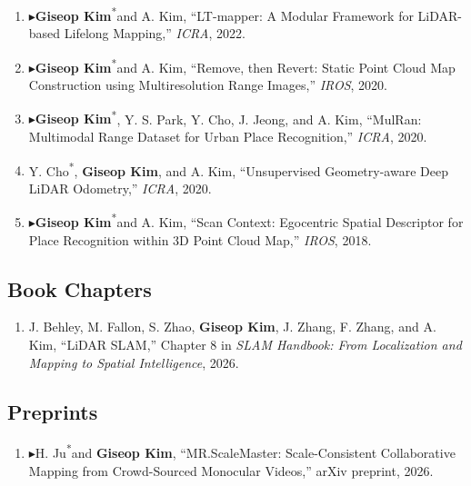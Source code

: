 \documentclass[10pt,a4paper]{article}
\newcommand{\pub}[1]{\item #1}
\newcommand{\leadpub}{\textbf{\ensuremath{\blacktriangleright}}\hspace{0.25em}}
\newcommand{\me}{\textbf{Giseop Kim}}
\newcommand{\corr}{\textsuperscript{\dag}}
\newcommand{\first}{\textsuperscript{*}}
\begin{document}
\begin{enumerate}[resume]
\pub{\leadpub \me\first and A. Kim\corr, ``LT-mapper: A Modular Framework for LiDAR-based Lifelong Mapping,'' \textit{ICRA}, 2022.}
\pub{\leadpub \me\first and A. Kim\corr, ``Remove, then Revert: Static Point Cloud Map Construction using Multiresolution Range Images,'' \textit{IROS}, 2020.}
\pub{\leadpub \me\first, Y. S. Park, Y. Cho, J. Jeong, and A. Kim\corr, ``MulRan: Multimodal Range Dataset for Urban Place Recognition,'' \textit{ICRA}, 2020.}
\pub{Y. Cho\first, \me, and A. Kim\corr, ``Unsupervised Geometry-aware Deep LiDAR Odometry,'' \textit{ICRA}, 2020.}
\pub{\leadpub \me\first and A. Kim\corr, ``Scan Context: Egocentric Spatial Descriptor for Place Recognition within 3D Point Cloud Map,'' \textit{IROS}, 2018.}
\end{enumerate}

\subsection{Book Chapters}
\begin{enumerate}[resume]
\pub{J. Behley, M. Fallon, S. Zhao, \me, J. Zhang, F. Zhang, and A. Kim, ``LiDAR SLAM,'' Chapter 8 in \textit{SLAM Handbook: From Localization and Mapping to Spatial Intelligence}, 2026.}
\end{enumerate}

\subsection{Preprints}
\begin{enumerate}[resume]
\pub{\leadpub H. Ju\first and \me\corr, ``MR.ScaleMaster: Scale-Consistent Collaborative Mapping from Crowd-Sourced Monocular Videos,'' arXiv preprint, 2026.}
\end{enumerate}
\end{document}
